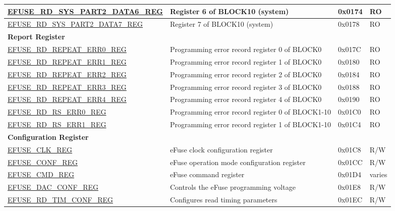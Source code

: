 \begin{longtable}{ | p{6cm} | p{7.2cm} | p{1.3cm} | p{1cm} | }
\hyperref[regdesc:EFUSERDSYSPART2DATA6REG]{EFUSE\_RD\_SYS\_PART2\_DATA6\_REG} & Register 6 of BLOCK10 (system)  & 0x0174 & RO \\ \hline
\hyperref[regdesc:EFUSERDSYSPART2DATA7REG]{EFUSE\_RD\_SYS\_PART2\_DATA7\_REG} & Register 7 of BLOCK10 (system)  & 0x0178 & RO \\ \hline
\multicolumn{4}{|l|}{\textbf{Report Register}} \\ \hline
\hyperref[regdesc:EFUSERDREPEATERR0REG]{EFUSE\_RD\_REPEAT\_ERR0\_REG} & Programming error record register 0 of BLOCK0  & 0x017C & RO \\ \hline
\hyperref[regdesc:EFUSERDREPEATERR1REG]{EFUSE\_RD\_REPEAT\_ERR1\_REG} & Programming error record register 1 of BLOCK0  & 0x0180 & RO \\ \hline
\hyperref[regdesc:EFUSERDREPEATERR2REG]{EFUSE\_RD\_REPEAT\_ERR2\_REG} & Programming error record register 2 of BLOCK0  & 0x0184 & RO \\ \hline
\hyperref[regdesc:EFUSERDREPEATERR3REG]{EFUSE\_RD\_REPEAT\_ERR3\_REG} & Programming error record register 3 of BLOCK0  & 0x0188 & RO \\ \hline
\hyperref[regdesc:EFUSERDREPEATERR4REG]{EFUSE\_RD\_REPEAT\_ERR4\_REG} & Programming error record register 4 of BLOCK0  & 0x0190 & RO \\ \hline
\hyperref[regdesc:EFUSERDRSERR0REG]{EFUSE\_RD\_RS\_ERR0\_REG} & Programming error record register 0 of BLOCK1-10  & 0x01C0 & RO \\ \hline
\hyperref[regdesc:EFUSERDRSERR1REG]{EFUSE\_RD\_RS\_ERR1\_REG} & Programming error record register 1 of BLOCK1-10  & 0x01C4 & RO \\ \hline
\multicolumn{4}{|l|}{\textbf{Configuration Register}} \\ \hline
\hyperref[regdesc:EFUSECLKREG]{EFUSE\_CLK\_REG} & eFuse clock configuration register  & 0x01C8 & R/W \\ \hline
\hyperref[regdesc:EFUSECONFREG]{EFUSE\_CONF\_REG} & eFuse operation mode configuration register & 0x01CC & R/W \\ \hline
\hyperref[regdesc:EFUSECMDREG]{EFUSE\_CMD\_REG} & eFuse command register  & 0x01D4 & varies \\ \hline
\hyperref[regdesc:EFUSEDACCONFREG]{EFUSE\_DAC\_CONF\_REG} & Controls the eFuse programming voltage  & 0x01E8 & R/W \\ \hline
\hyperref[regdesc:EFUSERDTIMCONFREG]{EFUSE\_RD\_TIM\_CONF\_REG} & Configures read timing parameters  & 0x01EC & R/W \\ \hline

\end{longtable}
